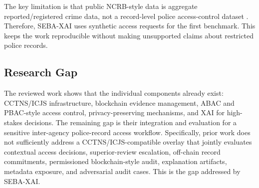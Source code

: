 The key limitation is that public NCRB-style data is aggregate reported/registered crime data, not a record-level police access-control dataset \cite{ncrb_2023}. Therefore, SEBA-XAI uses synthetic access requests for the first benchmark. This keeps the work reproducible without making unsupported claims about restricted police records.

\subsection{Research Gap}

The reviewed work shows that the individual components already exist: CCTNS/ICJS infrastructure, blockchain evidence management, ABAC and PBAC-style access control, privacy-preserving mechanisms, and XAI for high-stakes decisions. The remaining gap is their integration and evaluation for a sensitive inter-agency police-record access workflow. Specifically, prior work does not sufficiently address a CCTNS/ICJS-compatible overlay that jointly evaluates contextual access decisions, superior-review escalation, off-chain record commitments, permissioned blockchain-style audit, explanation artifacts, metadata exposure, and adversarial audit cases. This is the gap addressed by SEBA-XAI.

